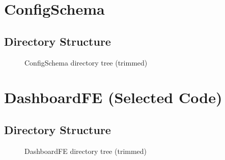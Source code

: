 \documentclass[11pt, a4paper, oneside, listof=totoc]{scrartcl}
\begin{document}
        \section{ConfigSchema}\label{app:configschema}

            \subsection*{Directory Structure}
            \begin{figure}[H]
                \centering
                \caption{ConfigSchema directory tree (trimmed)}\label{fig:configschema-tree}
            \end{figure}


        \cleardoublepage

        \section{DashboardFE (Selected Code)}\label{app:dashboardfe}

            \subsection*{Directory Structure}
            \begin{figure}[H]
                \centering
                \caption{DashboardFE directory tree (trimmed)}\label{fig:dashboardfe-tree}
            \end{figure}


\end{document}
